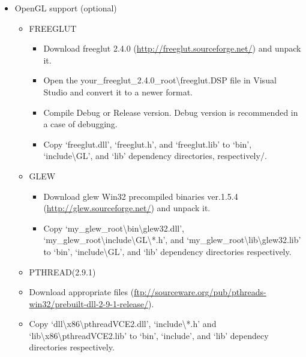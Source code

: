 \documentclass[a4paper,0pt,english]{sphinxmanual}
\begin{document}
\begin{itemize}
\item {} 
OpenGL support (optional)
\begin{itemize}
\item {} 
FREEGLUT
\begin{itemize}
\item {} 
Download freeglut 2.4.0 (\href{http://freeglut.sourceforge.net/}{http://freeglut.sourceforge.net/}) and unpack it.

\item {} 
Open the your\_freeglut\_2.4.0\_root\textbackslash{}freeglut.DSP file in Visual Studio and convert it to a newer format.

\item {} 
Compile Debug or Release version. Debug version is recommended in a case of debugging.

\item {} 
Copy `freeglut.dll', `freeglut.h', and `freeglut.lib' to `bin', `include\textbackslash{}GL', and `lib' dependency directories, respectively/.

\end{itemize}

\item {} 
GLEW
\begin{itemize}
\item {} 
Download glew Win32 precompiled binaries ver.1.5.4 (\href{http://glew.sourceforge.net/}{http://glew.sourceforge.net/}) and unpack it.

\item {} 
Copy `my\_glew\_root\textbackslash{}bin\textbackslash{}glew32.dll', `my\_glew\_root\textbackslash{}include\textbackslash{}GL\textbackslash{}*.h', and `my\_glew\_root\textbackslash{}lib\textbackslash{}glew32.lib' to `bin', `include\textbackslash{}GL', and `lib' dependency directories respectively.

\end{itemize}

\item {} 
PTHREAD(2.9.1)

\item {} 
Download appropriate files (\href{ftp://sourceware.org/pub/pthreads-win32/prebuilt-dll-2-9-1-release/}{ftp://sourceware.org/pub/pthreads-win32/prebuilt-dll-2-9-1-release/}).

\item {} 
Copy `dll\textbackslash{}x86\textbackslash{}pthreadVCE2.dll', `include\textbackslash{}*.h' and `lib\textbackslash{}x86\textbackslash{}pthreadVCE2.lib' to `bin', `include', and `lib' dependecy directories respectively.


\end{itemize}
\end{itemize}
\end{document}
